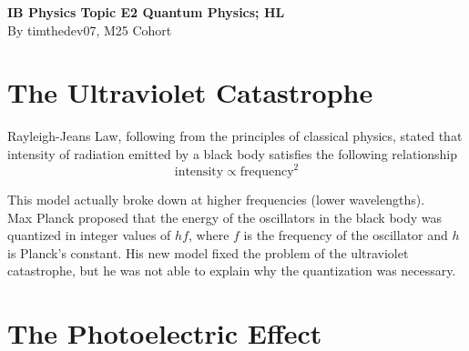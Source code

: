 \documentclass[a4paper,12pt]{article}
\let\oldsection\section
\renewcommand\section{\clearpage\oldsection}
\newcommand{\lb}{\\[8pt]}
\begin{document}
\pagestyle{fancy}


\begin{titlepage}
  \begin{center}

    \vspace*{8cm}
    \textbf{\Large {IB Physics Topic E2 Quantum Physics; HL}} \\
    \vspace*{1cm}
    \large{By timthedev07, M25 Cohort}

  \end{center}
\end{titlepage}

\pagebreak
\tableofcontents
\pagebreak

\clearpage
\setcounter{page}{1}

\section{The Ultraviolet Catastrophe}

Rayleigh-Jeans Law, following from the principles of classical physics, stated that intensity of radiation emitted by a black body satisfies the following relationship
$$\text{intensity} \propto \text{frequency}^2$$

This model actually broke down at higher frequencies (lower wavelengths).\lb
Max Planck proposed that the energy of the oscillators in the black body was quantized in integer values of $hf$, where $f$ is the frequency of the oscillator and $h$ is Planck's constant. His new model fixed the problem of the ultraviolet catastrophe, but he was not able to explain why the quantization was necessary.

\section{The Photoelectric Effect}
\end{document}
